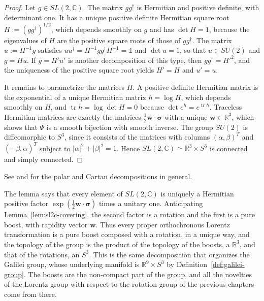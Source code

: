 	\begin{proof}
		Let $g\in SL(2,\mathbb{C})$. The matrix $gg^\dagger$ is Hermitian and positive definite, with determinant one. It has a unique positive definite Hermitian square root $H:=(gg^\dagger)^{1/2}$, which depends smoothly on $g$ and has $\det H=1$, because the eigenvalues of $H$ are the positive square roots of those of $gg^\dagger$. The matrix $u:=H^{-1}g$ satisfies $uu^\dagger=H^{-1}gg^\dagger H^{-1}=\mathbb{1}$ and $\det u=1$, so that $u\in SU(2)$ and $g=Hu$. If $g=H'u'$ is another decomposition of this type, then $gg^\dagger=H'^2$, and the uniqueness of the positive square root yields $H'=H$ and $u'=u$.
		
		It remains to parametrize the matrices $H$. A positive definite Hermitian matrix is the exponential of a unique Hermitian matrix $h=\log H$, which depends smoothly on $H$, and $\operatorname{tr}h=\log\det H=0$ because $\det e^h=e^{\operatorname{tr}h}$. Traceless Hermitian matrices are exactly the matrices $\tfrac12\mathbf{w}\cdot\boldsymbol{\sigma}$ with a unique $\mathbf{w}\in\mathbb{R}^3$, which shows that $\Psi$ is a smooth bijection with smooth inverse. The group $SU(2)$ is diffeomorphic to $S^3$, since it consists of the matrices with columns $(\alpha,\beta)^T$ and $(-\bar\beta,\bar\alpha)^T$ subject to $|\alpha|^2+|\beta|^2=1$. Hence $SL(2,\mathbb{C})\simeq\mathbb{R}^3\times S^3$ is connected and simply connected.
	\end{proof}
	
	\noindent See \cite[TODO-location]{TODO-Hal03} and \cite[Chapter 3, \S6]{TODO-BarutRaczka} for the polar and Cartan decompositions in general.
	
	\begin{remark}\label{rem:polar-meaning}
		The lemma says that every element of $SL(2,\mathbb{C})$ is uniquely a Hermitian positive factor $\exp(\frac12\mathbf{w}\cdot\boldsymbol{\sigma})$ times a unitary one. Anticipating Lemma~\ref{lem:sl2c-covering}, the second factor is a rotation and the first is a pure boost, with rapidity vector $\mathbf{w}$. Thus every proper orthochronous Lorentz transformation is a pure boost composed with a rotation, in a unique way, and the topology of the group is the product of the topology of the boosts, a $\mathbb{R}^3$, and that of the rotations, an $S^3$. This is the same decomposition that organizes the Galilei group, whose underlying manifold is $\mathbb{R}^9\times S^3$ by Definition~\ref{def:galilei-group}. The boosts are the non-compact part of the group, and all the novelties of the Lorentz group with respect to the rotation group of the previous chapters come from there.
	\end{remark}
	

